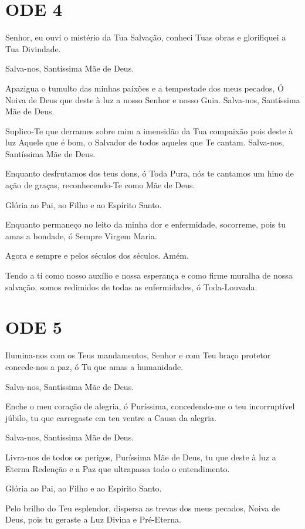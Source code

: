 \documentclass{subfiles}
\begin{document}
\section*{ODE 4}

\eirmos{}Senhor, eu ouvi o mistério da Tua Salvação, conheci Tuas obras
e glorifiquei a Tua Divindade.

Salva-nos, Santíssima Mãe de Deus.

Apazigua o tumulto das minhas paixões e a tempestade dos meus
pecados, Ó Noiva de Deus que deste à luz a nosso Senhor e nosso Guia.
Salva-nos, Santíssima Mãe de Deus.

Suplico-Te que derrames sobre mim a imensidão da Tua compaixão
pois deste à luz Aquele que é bom, o Salvador de todos aqueles que Te cantam.
Salva-nos, Santíssima Mãe de Deus.

Enquanto desfrutamos dos teus dons, ó Toda Pura, nós te cantamos
um hino de ação de graças, reconhecendo-Te como Mãe de Deus.

Glória ao Pai, ao Filho e ao Espírito Santo.

Enquanto permaneço no leito da minha dor e enfermidade, socorreme, pois tu amas
a bondade, ó Sempre Virgem Maria.

Agora e sempre e pelos séculos dos séculos. Amém.

Tendo a ti como nosso auxílio e nossa esperança e como firme muralha
de nossa salvação, somos redimidos de todas as enfermidades, ó Toda-Louvada.

\section*{ODE 5}

\eirmos{}Ilumina-nos com os Teus mandamentos, Senhor e com Teu
braço protetor concede-nos a paz, ó Tu que amas a humanidade.

Salva-nos, Santíssima Mãe de Deus.

Enche o meu coração de alegria, ó Puríssima, concedendo-me o teu
incorruptível júbilo, tu que carregaste em teu ventre a Causa da alegria.

Salva-nos, Santíssima Mãe de Deus.

Livra-nos de todos os perigos, Puríssima Mãe de Deus, tu que deste à
luz a Eterna Redenção e a Paz que ultrapassa todo o entendimento.

Glória ao Pai, ao Filho e ao Espírito Santo.

Pelo brilho do Teu esplendor, dispersa as trevas dos meus pecados,
Noiva de Deus, pois tu geraste a Luz Divina e Pré-Eterna.
\end{document}
